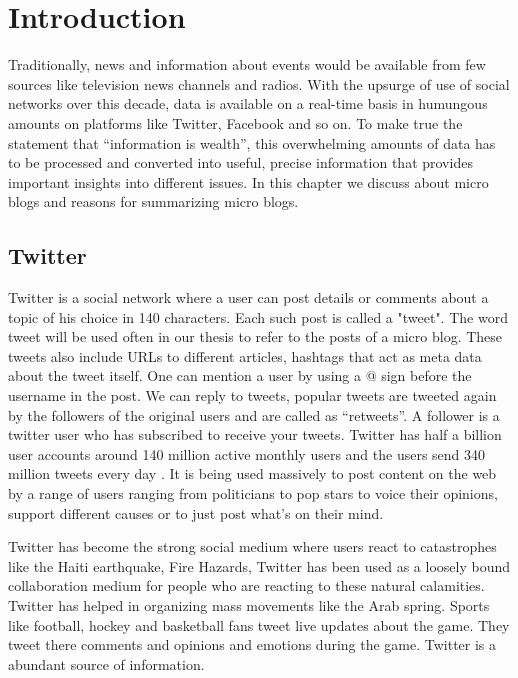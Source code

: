 \chapter{Introduction}
\label{chap-one}

Traditionally, news and information about events would be available from few sources like television news channels and radios. With the upsurge of use of social networks over this decade, data is available on a real-time basis in humungous amounts on platforms like Twitter, Facebook and so on. To make true the statement that “information is wealth”, this overwhelming amounts of data has to be processed and converted into useful, precise information that provides important insights into different issues. In this chapter we discuss about micro blogs and reasons for summarizing micro blogs. 

\section{Twitter}
Twitter is a social network where a user can post details or comments about a topic of his choice in 140 characters. Each such post is called a "tweet". The word tweet will be used often in our thesis to refer to the posts of a micro blog. These tweets also include URLs to different articles, hashtags that act as meta data about the tweet itself.  One can mention a user by using a @ sign before the username in the post. We can reply to tweets, popular tweets are tweeted again by the followers of the original users and are called as “retweets”. A follower is a twitter user who has subscribed to receive your tweets. Twitter has half a billion user accounts around 140 million active monthly users and the users send 340 million tweets every day \cite{twitterstats}. It is being used massively to post content on the web by a range of users ranging from politicians to pop stars to voice their opinions, support different causes or to just post what's on their mind.

Twitter has become the strong social medium where users react to catastrophes like the Haiti earthquake, Fire Hazards, Twitter has been used as a loosely bound collaboration medium for people who are reacting to these natural calamities. Twitter has helped in organizing mass movements like the Arab spring. Sports like football, hockey and basketball fans tweet live updates about the game. They tweet there comments and opinions and emotions during the game. Twitter is a abundant source of information. 

